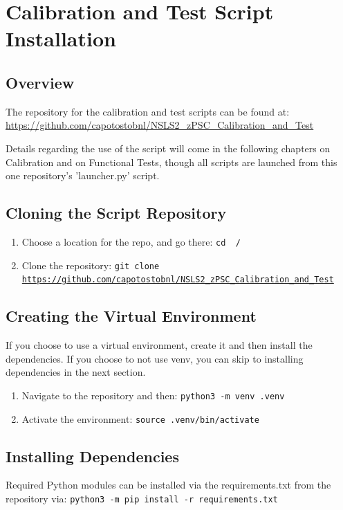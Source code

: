 
\chapter{Calibration and Test Script Installation}
\label{chap:Calibration and Test Script Installation}
\section{Overview}

The repository for the calibration and test scripts can be found at: \url{https://github.com/capotostobnl/NSLS2_zPSC_Calibration_and_Test}

Details regarding the use of the script will come in the following chapters on Calibration and on Functional Tests, though all scripts are launched from this one repository's 'launcher.py' script. 

\section{Cloning the Script Repository}
	\begin{enumerate}
		\item Choose a location for the repo, and go there: \texttt{cd ~/}
		\item Clone the repository: \texttt{git clone \url{https://github.com/capotostobnl/NSLS2_zPSC_Calibration_and_Test}}
	\end{enumerate}
	
\section{Creating the Virtual Environment}
If you choose to use a virtual environment, create it and then install the dependencies. If you choose to not use venv, you can skip to installing dependencies in the next section. 
	\begin{enumerate}
		\item Navigate to the repository and then: \texttt{python3 -m venv .venv}
		\item Activate the environment: \texttt{source .venv/bin/activate}
	\end{enumerate}

\section{Installing Dependencies}
Required Python modules can be installed via the requirements.txt from the repository via: \texttt{python3 -m pip install -r requirements.txt}

